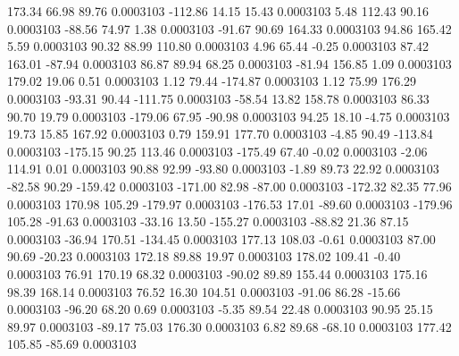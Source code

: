       173.34       66.98       89.76     0.0003103
     -112.86       14.15       15.43     0.0003103
        5.48      112.43       90.16     0.0003103
      -88.56       74.97        1.38     0.0003103
      -91.67       90.69      164.33     0.0003103
       94.86      165.42        5.59     0.0003103
       90.32       88.99      110.80     0.0003103
        4.96       65.44       -0.25     0.0003103
       87.42      163.01      -87.94     0.0003103
       86.87       89.94       68.25     0.0003103
      -81.94      156.85        1.09     0.0003103
      179.02       19.06        0.51     0.0003103
        1.12       79.44     -174.87     0.0003103
        1.12       75.99      176.29     0.0003103
      -93.31       90.44     -111.75     0.0003103
      -58.54       13.82      158.78     0.0003103
       86.33       90.70       19.79     0.0003103
     -179.06       67.95      -90.98     0.0003103
       94.25       18.10       -4.75     0.0003103
       19.73       15.85      167.92     0.0003103
        0.79      159.91      177.70     0.0003103
       -4.85       90.49     -113.84     0.0003103
     -175.15       90.25      113.46     0.0003103
     -175.49       67.40       -0.02     0.0003103
       -2.06      114.91        0.01     0.0003103
       90.88       92.99      -93.80     0.0003103
       -1.89       89.73       22.92     0.0003103
      -82.58       90.29     -159.42     0.0003103
     -171.00       82.98      -87.00     0.0003103
     -172.32       82.35       77.96     0.0003103
      170.98      105.29     -179.97     0.0003103
     -176.53       17.01      -89.60     0.0003103
     -179.96      105.28      -91.63     0.0003103
      -33.16       13.50     -155.27     0.0003103
      -88.82       21.36       87.15     0.0003103
      -36.94      170.51     -134.45     0.0003103
      177.13      108.03       -0.61     0.0003103
       87.00       90.69      -20.23     0.0003103
      172.18       89.88       19.97     0.0003103
      178.02      109.41       -0.40     0.0003103
       76.91      170.19       68.32     0.0003103
      -90.02       89.89      155.44     0.0003103
      175.16       98.39      168.14     0.0003103
       76.52       16.30      104.51     0.0003103
      -91.06       86.28      -15.66     0.0003103
      -96.20       68.20        0.69     0.0003103
       -5.35       89.54       22.48     0.0003103
       90.95       25.15       89.97     0.0003103
      -89.17       75.03      176.30     0.0003103
        6.82       89.68      -68.10     0.0003103
      177.42      105.85      -85.69     0.0003103
